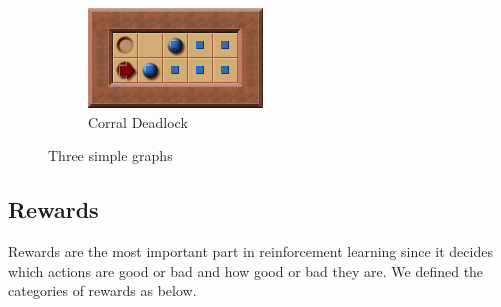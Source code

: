 \documentclass{article}
\begin{document}
\begin{figure}
     \begin{subfigure}[b]{0.3\textwidth}
         \centering
         \includegraphics[width=\textwidth]{CorralDeadlockExample.png}
         \caption{Corral Deadlock}
         \label{fig:corral}
     \end{subfigure}
        \caption{Three simple graphs}
        \label{fig:deadlocks}
\end{figure}

\subsection{Rewards}
Rewards are the most important part in reinforcement learning since it decides which actions are good or bad and how good or bad they are. We defined the categories of rewards as below.

\end{document}
